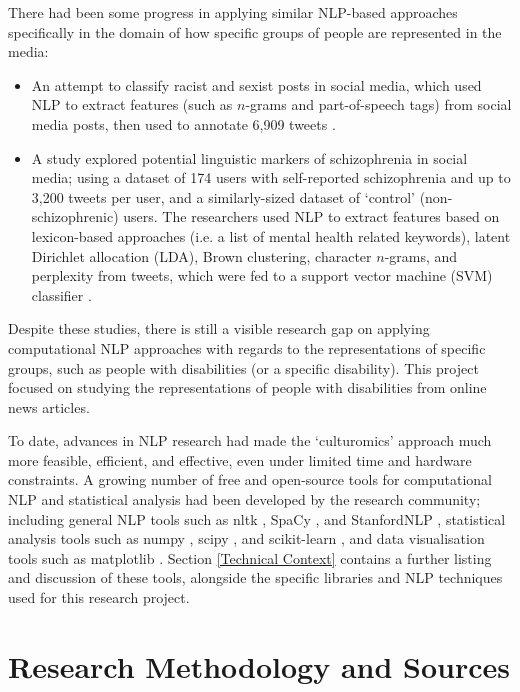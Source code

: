 \documentclass{report}
\begin{document}
There had been some progress in applying similar NLP-based approaches specifically in the domain of how specific groups of people are represented in the media:
\begin{itemize}
	\item An attempt to classify racist and sexist posts in social media, which used NLP to extract features (such as $n$-grams and part-of-speech tags) from social media posts, then used to annotate 6,909 tweets \cite{waseem2016you}.
	\item A study explored potential linguistic markers of schizophrenia in social media; using a dataset of 174 users with self-reported schizophrenia and up to 3,200 tweets per user, and a similarly-sized dataset of `control' (non-schizophrenic) users.
		The researchers used NLP to extract features based on lexicon-based approaches (i.e. a list of mental health related keywords), latent Dirichlet allocation (LDA), Brown clustering, character $n$-grams, and perplexity from tweets, which were fed to a support vector machine (SVM) classifier \cite{mitchell2015quantifying}.
\end{itemize}
Despite these studies, there is still a visible research gap on applying computational NLP approaches with regards to the representations of specific groups, such as people with disabilities (or a specific disability).
This project focused on studying the representations of people with disabilities from online news articles.

To date, advances in NLP research had made the `culturomics' approach much more feasible, efficient, and effective, even under limited time and hardware constraints.
A growing number of free and open-source tools for computational NLP and statistical analysis had been developed by the research community; including general NLP tools such as nltk \cite{Nltk}, SpaCy \cite{SpaCy}, and StanfordNLP \cite{StanfordNLP}, statistical analysis tools such as numpy \cite{Numpy}, scipy \cite{Scipy}, and scikit-learn \cite{Scikit-learn}, and data visualisation tools such as matplotlib \cite{Matplotlib}.
Section \ref{Technical Context} contains a further listing and discussion of these tools, alongside the specific libraries and NLP techniques used for this research project.

\section{Research Methodology and Sources} \label{Research Methodology and Sources}  %
\end{document}
